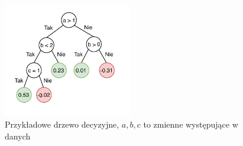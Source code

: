 \documentclass{pracalicmgr}
\begin{document}
	\begin{figure}[h]
	\centering
	\includegraphics[width=0.5\textwidth]{tree.pdf}
	\caption{Przykładowe drzewo decyzyjne, $a, b, c$ to zmienne występujące w danych}
	\label{fig:tree}
	\end{figure}
	
\end{document}
